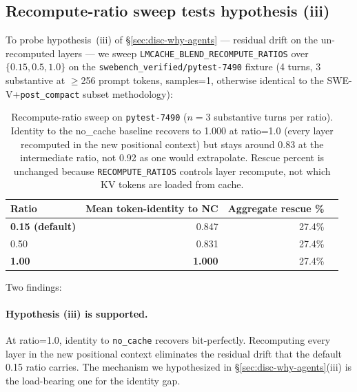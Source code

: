 \subsection{Recompute-ratio sweep tests hypothesis (iii)}
\label{sec:disc-knobs}

To probe hypothesis~(iii) of \S\ref{sec:disc-why-agents} ---
residual drift on the un-recomputed layers --- we sweep
\texttt{LMCACHE\_BLEND\_\allowbreak{}RECOMPUTE\_RATIOS} over
$\{0.15, 0.5, 1.0\}$ on the
\texttt{swebench\_verified/\allowbreak{}pytest-7490} fixture (4
turns, 3 substantive at $\geq$256 prompt tokens, samples=1, otherwise
identical to the SWE-V+\texttt{post\_compact} subset methodology):

\begin{table}[h]
\small
\centering
\begin{tabular}{lrrr}
\toprule
Ratio & Mean token-identity to NC & Aggregate rescue \% \\
\midrule
\textbf{0.15 (default)} & 0.847 & 27.4\% \\
0.50                    & 0.831 & 27.4\% \\
\textbf{1.00}           & \textbf{1.000} & 27.4\% \\
\bottomrule
\end{tabular}
\caption{Recompute-ratio sweep on \texttt{pytest-7490} ($n{=}3$
substantive turns per ratio). Identity to the no\_cache baseline
recovers to 1.000 at ratio=1.0 (every layer recomputed in the new
positional context) but stays around 0.83 at the intermediate ratio,
not 0.92 as one would extrapolate. Rescue percent is unchanged because
\texttt{RECOMPUTE\_RATIOS} controls layer recompute, not which KV
tokens are loaded from cache.}
\label{tab:recompute-sweep}
\end{table}

Two findings:

\paragraph{Hypothesis (iii) is supported.} At ratio=1.0, identity to
\texttt{no\_cache} recovers bit-perfectly. Recomputing every layer in
the new positional context eliminates the residual drift that the
default 0.15 ratio carries. The mechanism we hypothesized in
\S\ref{sec:disc-why-agents}(iii) is the load-bearing one for the
identity gap.


